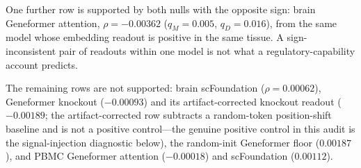 \documentclass[fleqn,10pt,lineno]{wlpeerj}
\begin{document}
\begin{table}[!tbp]\centering
\resizebox{\linewidth}{!}{}
\caption{Protocol-pass matrix for the thirteen pooled FM/readout rows (yes = pass, no = fail). Dual full / Dual non-deg:
both within-family BH $q_M,q_D<0.05$ under the named confound specification. Concord.:
FM--co-expression Spearman $>0$ (attention-likeness). ND same sign: full and non-degree partial
$\rho$ share sign. Multi-RO sign: all full-spec readouts of the same model family in that tissue
agree in sign (single-readout families pass). $\rho>$ base: full-spec $\rho$ exceeds the
tissue co-expression baseline on the same edge set. Protocol-pass is the conjunction of Dual full,
Concord., ND same sign, Multi-RO sign, and $\rho>$ base (Dual non-deg is reported but not required
beyond same-sign, matching the dual-null failure mode under non-degree). All thirteen rows fail
protocol-pass.}\label{tab:protocol}
\end{table}

One further row is supported by both nulls with the opposite sign: brain Geneformer attention,
$\rho=-0.00362$ ($q_M=0.005$, $q_D=0.016$), from the same model whose embedding readout is positive
in the same tissue. A sign-inconsistent pair of readouts within one model is not what a
regulatory-capability account predicts.

The remaining rows are not supported: brain scFoundation ($\rho=0.00062$), Geneformer knockout
($-0.00093$) and its artifact-corrected knockout readout ($-0.00189$; the artifact-corrected row
subtracts a random-token position-shift baseline and is not a positive control---the genuine
positive control in this audit is the signal-injection diagnostic below), the random-init Geneformer floor
($0.00187$), and PBMC Geneformer attention ($-0.00018$) and scFoundation ($0.00112$).
\end{document}
